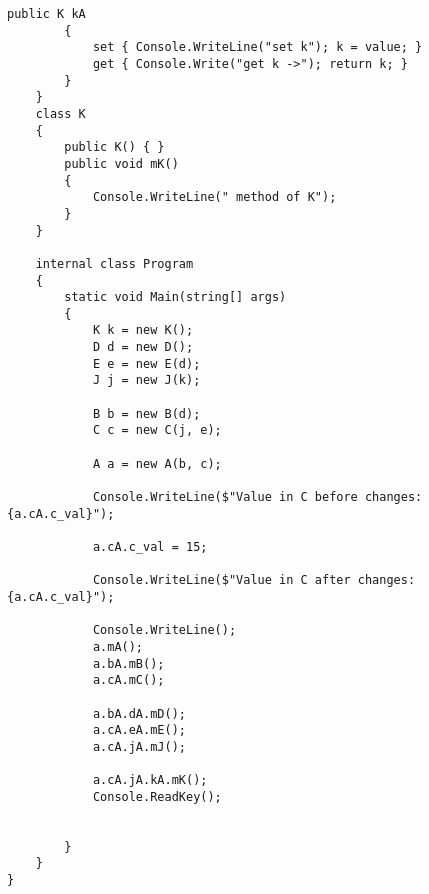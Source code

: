 \begin{lstlisting}[language={[Sharp]C}]
        public K kA
        {
            set { Console.WriteLine("set k"); k = value; }
            get { Console.Write("get k ->"); return k; }
        }
    }
    class K
    {
        public K() { }
        public void mK()
        {
            Console.WriteLine(" method of K");
        }
    }

    internal class Program
    {
        static void Main(string[] args)
        {
            K k = new K();
            D d = new D();
            E e = new E(d);
            J j = new J(k);

            B b = new B(d);
            C c = new C(j, e);

            A a = new A(b, c);

            Console.WriteLine($"Value in C before changes: {a.cA.c_val}");

            a.cA.c_val = 15;

            Console.WriteLine($"Value in C after changes: {a.cA.c_val}");

            Console.WriteLine();
            a.mA();
            a.bA.mB();
            a.cA.mC();

            a.bA.dA.mD();
            a.cA.eA.mE();
            a.cA.jA.mJ();

            a.cA.jA.kA.mK();
            Console.ReadKey();


        }
    }
}


\end{lstlisting}